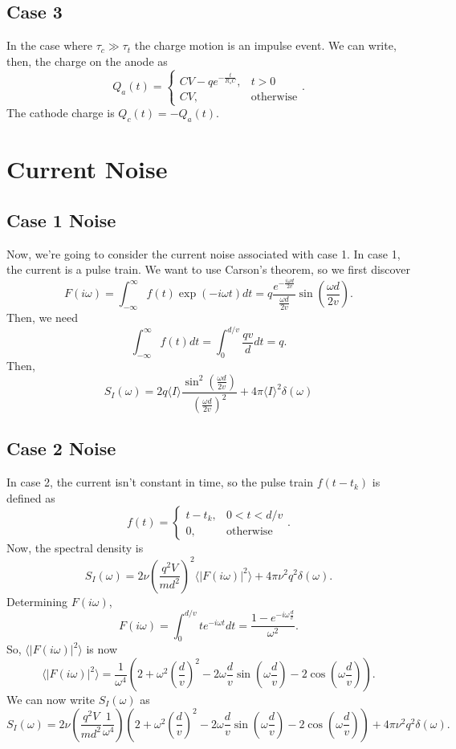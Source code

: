 \documentclass{article}
\begin{document}
\subsection{Case 3}
\label{sub:case_3}
In the case where $ \tau_{c} \gg \tau_{t} $ the charge motion is an impulse
event. We can write, then, the charge on the anode as
\[
   Q_{a}(t) = \begin{cases}
      CV - q e^{-\frac{t}{R_{s}C}}, & t > 0 \\
      CV , & \text{otherwise}
   \end{cases}.
\]
The cathode charge is $ Q_{c}(t) = -Q_{a}(t) $.

\section{Current Noise}
\label{sec:current_noise}

\subsection{Case 1 Noise}
\label{sub:case_1_noise}


Now, we're going to consider the current noise associated with case 1. In case
1, the current is a pulse train. We want to use Carson's theorem, so we first
discover
\[
   F(i\omega) = \int_{-\infty}^{\infty} f(t) \exp(-i \omega t) dt = q
   \frac{e^{-\frac{i \omega d}{2 v}}}{\frac{\omega d}{2 v}} \sin(\frac{\omega
   d}{2 v}).
\]
Then, we need
\[
   \int_{-\infty}^{\infty} f(t) dt = \int_{0}^{d/v} \frac{qv}{d} dt = q.
\]
Then,
\[
   S_{I}(\omega) = 2q \langle I \rangle \frac{\sin^2(\frac{\omega d }{2
      v})}{\left( \frac{\omega d}{2 v} \right)^2} + 4 \pi \langle I
      \rangle^{2}\delta(\omega)
\]

\subsection{Case 2 Noise}
\label{sub:case_2_noise}

In case 2, the current isn't constant in time, so the pulse train $ f(t-t_{k}) $
is defined as
\[
   f(t) = \begin{cases}
      t-t_{k}, & 0 < t < d/v \\
      0, & \text{otherwise}
   \end{cases}.
\]
Now, the spectral density is
\[
   S_{I}(\omega) = 2 \nu \left( \frac{q^{2}V}{md^2} \right)^2 \langle
   |F(i\omega)|^2 \rangle + 4 \pi \nu^{2}q^{2} \delta(\omega).
\]
Determining $ F(i\omega) $,
\[
   F(i\omega) = \int_{0}^{d/v}t e^{-i \omega t} dt =  \frac{1 - e^{-i \omega
   \frac{d}{v}}}{\omega^{2}}.
\]
So, $ \langle | F(i\omega)|^{2} \rangle $ is now
\[
   \langle | F(i\omega)|^{2} \rangle  = \frac{1}{\omega^{4}} \left( 2 +
      \omega^{2} (\frac{d}{v})^{2} - 2 \omega \frac{d}{v}\sin(\omega
   \frac{d}{v}) - 2 \cos(\omega \frac{d}{v}) \right).
\]
We can now write $ S_{I}(\omega) $ as
\[
   S_{I}(\omega) = 2 \nu \left( \frac{q^{2}V}{m d^{2}} \frac{1}{\omega^{4}} \right)
\left( 2 +
      \omega^{2} (\frac{d}{v})^{2} - 2 \omega \frac{d}{v}\sin(\omega
      \frac{d}{v}) - 2 \cos(\omega \frac{d}{v}) \right) + 4 \pi
      \nu^{2}q^{2}\delta(\omega).
\]
\end{document}
